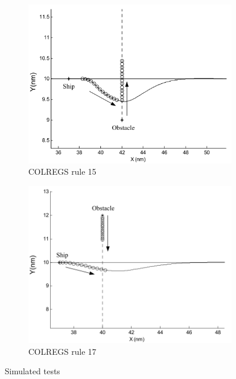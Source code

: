 \begin{figure}[H]
        \begin{subfigure}[b]{0.5\textwidth}
            \centering
            \includegraphics[width=\textwidth]{figs/Chap3/Lee2004Fuzzy_COLREGS15a.png}
            \caption{\ac{COLREGS} rule 15}
            \label{fig:Lee2004Fuzzy_COLREGS15}
        \end{subfigure}
        \begin{subfigure}[b]{0.45\textwidth}
            \centering
            \includegraphics[width=\textwidth]{figs/Chap3/Lee2004Fuzzy_COLREGS18.png}
            \caption{\ac{COLREGS} rule 17}
            \label{fig:Lee2004Fuzzy_COLREGS18}
        \end{subfigure}
    
    \caption{Simulated tests \cite{Lee2004Fuzzy}}
    \label{fig:Lee2004Fuzzy_COLREGS_13_14_15_17}
    \end{figure}
    
